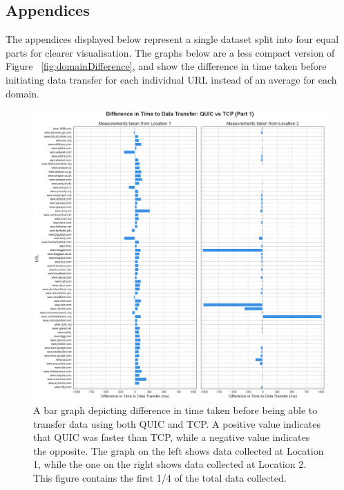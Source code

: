 \documentclass{l4proj}
\begin{document}
\begin{appendices}

\chapter{Appendices}

The appendices displayed below represent a single dataset split into four equal parts for clearer visualisation. The graphs below are a less compact version of Figure ~\ref{fig:domainDifference}, and show the difference in time taken before initiating data transfer for each individual URL instead of an average for each domain. 

\begin{figure}[hbtp]
    \centering
    \includegraphics[width=1\linewidth]{images/urlDifference_QUICvsTCP_part1.png}
    \caption{A bar graph depicting difference in time taken before being able to transfer data using both QUIC and TCP. A positive value indicates that QUIC was faster than TCP, while a negative value indicates the opposite. The graph on the left shows data collected at Location 1, while the one on the right shows data collected at Location 2. This figure contains the first 1/4 of the total data collected.}
    \label{fig:urlDifference_p1}
\end{figure}


\end{appendices}
\end{document}
